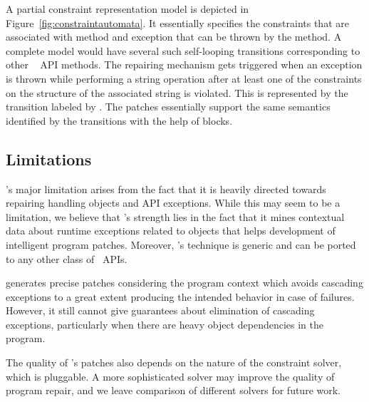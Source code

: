 

A partial constraint representation model is depicted in
Figure~\ref{fig:constraintautomata}. It essentially specifies the constraints
that are associated with 
method and  exception that can be thrown by the
method. A complete model would
have several such self-looping transitions corresponding to other \java\
 API methods. The
repairing mechanism gets triggered when an exception is thrown while performing
a string operation after at least one of the constraints on the structure of
the associated string is violated. This is represented by the transition labeled
by \code{other}. The patches essentially support the same
semantics identified by the transitions with the help of  blocks.


\subsection{Limitations}
\label{sec:tool:limitation}

\tool's major limitation arises from the fact that it is heavily directed
towards repairing handling \code{String} objects and API exceptions. While this
may seem to be a limitation, we believe that \tool's strength lies in the fact
that it mines contextual data about runtime exceptions related to \code{String}
objects that helps development of intelligent program patches. Moreover, \tool's
technique is generic and can be ported to any other class of \java\ APIs.

\tool generates precise patches considering the program context which avoids
cascading exceptions to a great extent producing the intended behavior in case
of failures. However, it still cannot give guarantees about elimination of cascading
exceptions, particularly when there are heavy object dependencies in the program.

The quality of \tool's patches also depends on the nature of the constraint
solver, which is pluggable. A more sophisticated solver may improve the quality
of program repair, and we leave comparison of different solvers for future work.

